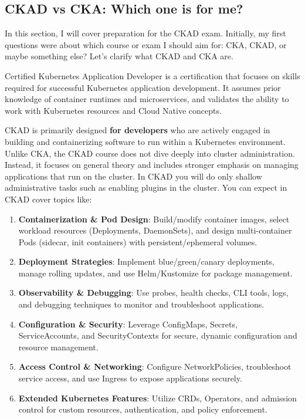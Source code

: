 \subsection{CKAD vs CKA: Which one is for me?}

In this section, I will cover preparation for the CKAD exam. Initially, my first questions were about which course or exam I should aim for: CKA, CKAD, or maybe something else? Let's clarify what CKAD and CKA are.

\begin{definition}[CKAD] 
	Certified Kubernetes Application Developer is a certification that focuses on skills required for successful Kubernetes application development. It assumes prior knowledge of container runtimes and microservices, and validates the ability to work with Kubernetes resources and Cloud Native concepts\cite{linuxfoundation-ckad}.
\end{definition}

CKAD is primarily designed \textbf{for developers} who are actively engaged in building and containerizing software to run within a Kubernetes environment. Unlike CKA, the CKAD course does not dive deeply into cluster administration. Instead, it focuses on general theory and includes stronger emphasis on managing applications that run on the cluster. In CKAD you will do only shallow administrative tasks such as enabling plugins in the cluster. You can expect in CKAD cover topics like\cite{linuxfoundation-ckad}:

\begin{enumerate}
	\item \textbf{Containerization \& Pod Design}: Build/modify container images, select workload resources (Deployments, DaemonSets), and design multi-container Pods (sidecar, init containers) with persistent/ephemeral volumes.  
	\item \textbf{Deployment Strategies}: Implement blue/green/canary deployments, manage rolling updates, and use Helm/Kustomize for package management.  
	\item \textbf{Observability \& Debugging}: Use probes, health checks, CLI tools, logs, and debugging techniques to monitor and troubleshoot applications.  
	\item \textbf{Configuration \& Security}: Leverage ConfigMaps, Secrets, ServiceAccounts, and SecurityContexts for secure, dynamic configuration and resource management.  
	\item \textbf{Access Control \& Networking}: Configure NetworkPolicies, troubleshoot service access, and use Ingress to expose applications securely.  
	\item \textbf{Extended Kubernetes Features}: Utilize CRDs, Operators, and admission control for custom resources, authentication, and policy enforcement.  
\end{enumerate}


